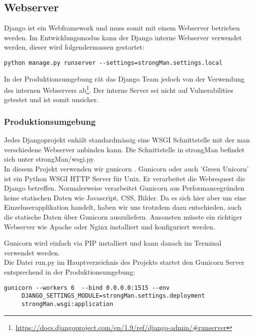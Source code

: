 \subsection{Webserver}
Django ist ein Webframework und muss somit mit einem Webserver betrieben werden.
Im Entwicklungsmodus kann der Django interne Webserver verwendet werden, dieser wird folgendermassen gestartet:
\begin{lstlisting}[style=BashInputStyle]
	 python manage.py runserver --settings=strongMan.settings.local
\end{lstlisting}

\medskip

In der Produktionsumgebung rät das Django Team jedoch von der Verwendung des internen Webservers ab\footnote{\url{https://docs.djangoproject.com/en/1.9/ref/django-admin/\#runserver}}. Der interne Server sei nicht auf Vulnerabilities getestet und ist somit unsicher.


\subsubsection{Produktionsumgebung}
Jedes Djangoprojekt enhält standardmässig eine WSGI \cite{wsgi} Schnittstelle mit der man verschiedene Webserver anbinden kann. Die Schnittstelle in strongMan befindet sich unter strongMan/wsgi.py. \\

 In diesem Projekt verwenden wir gunicorn \cite{gunicorn}. Gunicorn oder auch 'Green Unicorn' ist ein Python WSGI HTTP Server für Unix. Er verarbeitet die Webrequest die Django betreffen. Normalerweise verarbeitet Gunicorn aus Performancegründen keine statischen Daten wie Javascript, CSS, Bilder. Da es sich hier aber um eine Einzeluserapplikation handelt, haben wir uns trotzdem dazu entschieden, auch die statische Daten über Gunicorn auszuliefern. Ansonsten müsste ein richtiger Webserver wie Apache oder Nginx installiert und konfiguriert werden.

Gunicorn wird einfach via PIP installiert und kann danach im Terminal verwendet werden.\\


Die Datei run.py im Hauptverzeichnis des Projekts startet den Gunicorn Server entsprechend in der Produktionsumgebung:

\begin{lstlisting}[style=BashInputStyle]
	 gunicorn --workers 6  --bind 0.0.0.0:1515 --env
	 DJANGO_SETTINGS_MODULE=strongMan.settings.deployment 
	 strongMan.wsgi:application
\end{lstlisting}

